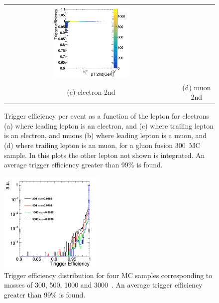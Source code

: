 \begin{figure}[htbp]
\begin{tabular}{cc}
 \includegraphics[width=0.45\textwidth]{../AN/Figs/Trigger/mu2.png} \\
 (c) electron 2nd & (d) muon 2nd \\
\end{tabular}
\caption{
      Trigger efficiency per event
      as a function of the lepton \pt
      for electrons (a) where leading lepton is an electron, 
      and (c) where trailing lepton is an electron, 
      and muons (b) where leading lepton is a muon, 
      and (d) where trailing lepton is an muon, 
      for a gluon fusion 300~\GeV MC sample.
      In this plots the other lepton not shown is
      integrated.
      An average trigger efficiency greater than 99\% is found.      
     }
    \label{Fig:trigger}
\end{figure}
\begin{figure}[htbp]
\centering
 \includegraphics[width=0.45\textwidth]{../AN/Figs/Trigger/triggW.png}
\caption{
      Trigger efficiency distribution for 
      four MC samples corresponding to masses of 300, 500, 1000 and 3000~\GeV.
      An average trigger efficiency greater than 99\% is found.
     }
    \label{Fig:triggerIntegral}
\end{figure}


